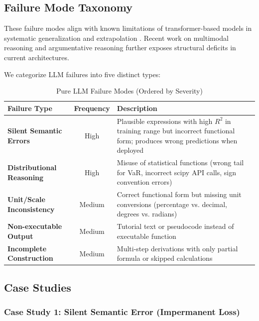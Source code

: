 \documentclass[twoside,11pt]{article}
\begin{document}
\subsection{Failure Mode Taxonomy}

These failure modes align with known limitations of transformer-based models in systematic generalization \citep{lake2017building} and extrapolation \citep{zhang2024extrapolation}. Recent work on multimodal reasoning \citep{malkinski2025multimodal} and argumentative reasoning \citep{gould2025argumentative} further exposes structural deficits in current architectures.

We categorize LLM failures into five distinct types:

\begin{table}[htbp]
\centering
\caption{Pure LLM Failure Modes (Ordered by Severity)}
\label{tab:failure_modes}
\begin{tabular}{@{}lcp{7cm}@{}}
\toprule
\textbf{Failure Type} & \textbf{Frequency} & \textbf{Description} \\
\midrule
\textbf{Silent Semantic Errors} & High & Plausible expressions with high $R^2$ in training range but incorrect functional form; produces wrong predictions when deployed \\
\midrule
\textbf{Distributional Reasoning} & High & Misuse of statistical functions (wrong tail for VaR, incorrect scipy API calls, sign convention errors) \\
\midrule
\textbf{Unit/Scale Inconsistency} & Medium & Correct functional form but missing unit conversions (percentage vs. decimal, degrees vs. radians) \\
\midrule
\textbf{Non-executable Output} & Medium & Tutorial text or pseudocode instead of executable function \\
\midrule
\textbf{Incomplete Construction} & Medium & Multi-step derivations with only partial formula or skipped calculations \\
\bottomrule
\end{tabular}
\end{table}

\subsection{Case Studies}

\subsubsection{Case Study 1: Silent Semantic Error (Impermanent Loss)}
\end{document}
